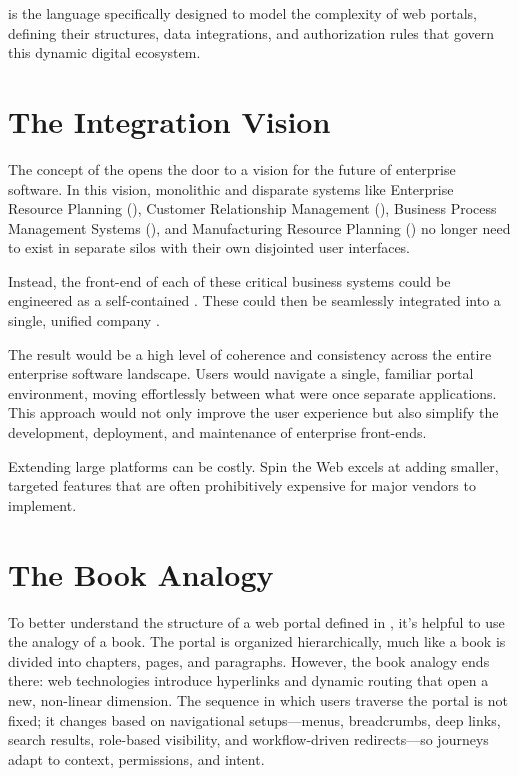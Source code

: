 \wbdl{} is the language specifically designed to model the complexity of web portals, defining their structures, data integrations, and authorization rules that govern this dynamic digital ecosystem.

\section{The Integration Vision}
\label{sec:integration-vision}

The concept of the \textbf{\webbaselet{}} opens the door to a vision for the future of enterprise software. In this vision, monolithic and disparate systems like Enterprise Resource Planning (\erp{}), Customer Relationship Management (\crm{}), Business Process Management Systems (\bpms{}), and Manufacturing Resource Planning (\mrp{}) no longer need to exist in separate silos with their own disjointed user interfaces.

Instead, the front-end of each of these critical business systems could be engineered as a self-contained \textbf{\webbaselet{}}. These  could then be seamlessly integrated into a single, unified company \textbf{\webbase{}}.

The result would be a high level of coherence and consistency across the entire enterprise software landscape. Users would navigate a single, familiar portal environment, moving effortlessly between what were once separate applications. This approach would not only improve the user experience but also simplify the development, deployment, and maintenance of enterprise front-ends.

Extending large platforms can be costly. Spin the Web excels at adding smaller, targeted features that are often prohibitively expensive for major vendors to implement.

\section{The Book Analogy}
\label{sec:book-analogy}

To better understand the structure of a web portal defined in \wbdl{}, it's helpful to use the analogy of a book. The portal is organized hierarchically, much like a book is divided into chapters, pages, and paragraphs. However, the book analogy ends there: web technologies introduce hyperlinks and dynamic routing that open a new, non-linear dimension. The sequence in which users traverse the portal is not fixed; it changes based on navigational setups---menus, breadcrumbs, deep links, search results, role-based visibility, and workflow-driven redirects---so journeys adapt to context, permissions, and intent.


